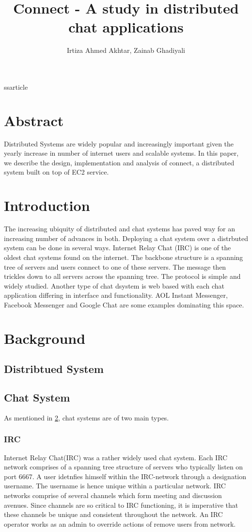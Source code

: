 ss{article}

\title{Connect - A study in distributed chat applications}
\author{Irtiza Ahmed Akhtar, Zainab Ghadiyali}

\maketitle

\section{Abstract}
Distributed Systems are widely popular and increasingly important given the yearly increase in number of internet users and scalable systems. In this paper, we describe the design, implementation and analysis of connect, a distributed system built on top of EC2 service. 
\section{Introduction}
\label{Introduction}
The increasing ubiquity of distributed and chat systems has paved way for an increasing number of advances in both. Deploying a chat system over a distrbuted system can be done in several ways. Internet Relay Chat (IRC) is one of the oldest chat systems found on the internet. The backbone structure is a spanning tree of servers and users connect to one of these servers. The message then trickles down to all servers across the spanning tree. The protocol is simple and widely studied. Another type of chat dsystem is web based with each chat application differing in interface and functionality. AOL Instant Messenger, Facebook Messenger and Google Chat are some examples dominating this space.
 
\section{Background}
\label{Background}
\subsection{Distribtued System}
\subsection{Chat System}
As mentioned in \ref{Introduction}, chat systems are of two main types. 
\subsubsection{IRC}
Internet Relay Chat(IRC\cite{IRC}) was a rather widely used chat system. Each IRC network comprises of a spanning tree structure of servers who typically listen on port 6667. A user idetnfies himself within the IRC-network through a designation username. The username is hence unique within a particular network. 
IRC networks comprise of several channels which form meeting and discussion avenues. Since channels are so critical to IRC functioning, it is imperative that these channels be unique and consistent throughout the network. An IRC operator works as an admin to override actions of remove users from network. 
